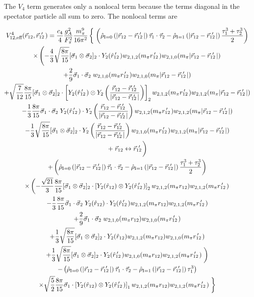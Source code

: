 \documentclass[%
 preprint,
 amsmath,amssymb,
 aps,
]{revtex4-1}
\newcommand{\rhohat}[2]{\hat{\rho}_{\text{I}=#1}\left( #2 \right)}
\newcommand{\rot}{\vec{r}_{12}}
\newcommand{\rotp}{\vec{r}_{12}\!\!\!'\,\,}
\newcommand{\rotpr}{r_{12}\!\!\!\!'\,\,\,}
\newcommand{\rotphat}{\hat{r}_{12}\!\!\!\!'\,\,\,}
\newcommand{\taudot}{\vec{\tau}_1\cdot\vec{\tau}_2}
\newcommand{\tauplusthree}{\frac{\tau_1^3+\tau_2^3}{2}}
\newcommand{\sigmadot}{\vec{\sigma}_1\cdot\vec{\sigma}_2}
\newcommand{\sigmatwo}{[\vec{\sigma}_1\otimes\vec{\sigma}_2]_2}
\newcommand{\fracphantom}{\vphantom{\frac{1}{1}}}
\newcommand{\w}[4]{w_{#1,#2,#3}(#4)}
\begin{document}
The $V_4$ term generates only a nonlocal term because the terms diagonal in the spectator particle all sum to zero. The nonlocal terms are

\begin{multline}
V^{4}_{12,\text{eff}}(\rot,\rotp) = \frac{c_4}{4}\frac{g_A^2}{F_\pi^2}\frac{m_\pi^9}{16\pi^2}\left\{ \fracphantom \right. 
\left(\rhohat{0}{|\rot-\rotp|}\taudot-\rhohat{1}{|\rot-\rotp|}\tauplusthree\right)
\\
\times\left( -\frac{4}{3}\sqrt{\frac{8\pi}{15}}\sigmatwo\cdot Y_2(\rotphat)\w{2}{1}{2}{m_\pi \rotpr}\w{2}{1}{0}{m_\pi |\rot-\rotp|} \right. \\
+\frac{2}{9}\sigmadot\; \w{2}{1}{0}{m_\pi \rotpr}\w{2}{1}{0}{m_\pi |\rot-\rotp|} \\
+\sqrt{\frac{7}{12}}\frac{8\pi}{15}\sigmatwo\cdot \left[ Y_2(\rotphat)\otimes Y_2 \left(\frac{\rot-\rotp}{|\rot-\rotp|}\right) \right]_2 \w{2}{1}{2}{m_\pi \rotpr}\w{2}{1}{2}{m_\pi |\rot-\rotp|} \\
-\frac{1}{3}\frac{8\pi}{15}\sigmadot \; Y_2(\rotphat)\cdot Y_2\left(\frac{\rot-\rotp}{|\rot-\rotp|}\right) \w{2}{1}{2}{m_\pi \rotpr}\w{2}{1}{2}{m_\pi |\rot-\rotp|} \\
-\frac{1}{3}\sqrt{\frac{8\pi}{15}}\sigmatwo\cdot Y_2\left(\frac{\rot-\rotp}{|\rot-\rotp|}\right)\w{2}{1}{0}{m_\pi \rotpr}\w{2}{1}{2}{m_\pi |\rot-\rotp|} \\
\left.+\; \rot \leftrightarrow \rotp \fracphantom\right) \\
+\left(\rhohat{0}{|\rot-\rotp|}\taudot-\rhohat{1}{|\rot-\rotp|}\tauplusthree\right) \\
\times \left( 
-\frac{\sqrt{21}}{3}\frac{8\pi}{15}\sigmatwo \cdot \left[Y_2(\hat{r}_{12})\otimes Y_2(\rotphat)\right]_2 \w{2}{1}{2}{m_\pi r_{12}} \w{2}{1}{2}{m_\pi \rotpr} \right. \\
-\frac{1}{3}\frac{8\pi}{15}\sigmadot\; Y_2(\hat{r}_{12}) \cdot Y_2(\rotphat)\w{2}{1}{2}{m_\pi r_{12}} \w{2}{1}{2}{m_\pi \rotpr} \\
+\frac{2}{9}\sigmadot \;\w{2}{1}{0}{m_\pi r_{12}} \w{2}{1}{0}{m_\pi \rotpr} \\
+\frac{1}{3}\sqrt{\frac{8\pi}{15}} \sigmatwo \cdot Y_2(\hat{r}_{12}) \w{2}{1}{2}{m_\pi r_{12}} \w{2}{1}{0}{m_\pi \rotpr} \\
+\frac{1}{3}\sqrt{\frac{8\pi}{15}} \sigmatwo \cdot Y_2(\rotphat) \w{2}{1}{0}{m_\pi r_{12}} \w{2}{1}{2}{m_\pi \rotpr} \left.\fracphantom\right) \\
%
-\left(\rhohat{0}{|\rot-\rotp|}\taudot-\rhohat{1}{|\rot-\rotp|}\tau_1^3 \right) \\
\times\sqrt{\frac{5}{2}} \frac{8\pi}{15} \vec{\sigma}_1\cdot\left[Y_2(\hat{r}_{12})\otimes Y_2(\rotphat)\right]_1 \w{2}{1}{2}{m_\pi r_{12}} \w{2}{1}{2}{m_\pi \rotpr} \left.\fracphantom\right\}
\end{multline}
\end{document}
